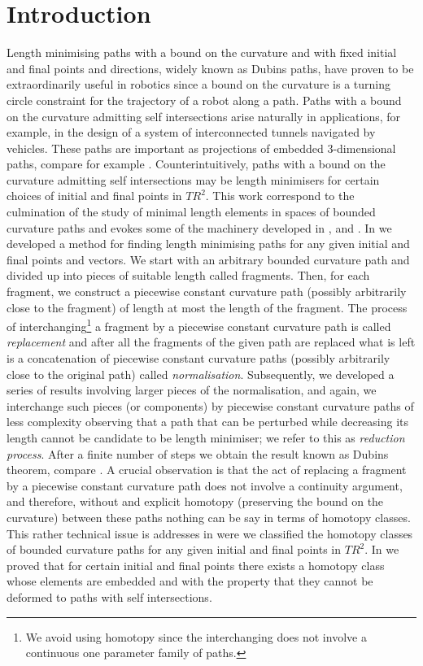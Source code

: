 \documentclass{amsart}
\theoremstyle{definition}
\theoremstyle{remark}
\numberwithin{equation}{section}
\begin{document}
\section{Introduction}
Length minimising paths with a bound on the curvature and with fixed initial and final points and directions, widely known as Dubins paths, have proven to be extraordinarily useful in robotics since a bound on the curvature is a turning circle constraint for the trajectory of a robot along a path. Paths with a bound on the curvature admitting self intersections arise naturally in applications, for example, in the design of a system of interconnected tunnels navigated by vehicles. These paths are important as projections of embedded 3-dimensional paths, compare for example \cite{brazil 1}. Counterintuitively, paths with a bound on the curvature admitting self intersections may be length minimisers for certain choices of initial and final points in $T{R}^2$. This work correspond to the culmination of the study of minimal length elements in spaces of bounded curvature paths and evokes some of the machinery developed in \cite{papera}, \cite{paperd} and \cite{paperc}. In \cite{papera} we developed a method for finding length minimising paths for any given initial and final points and vectors. We start with an arbitrary bounded curvature path and divided up into pieces of suitable length called fragments. Then, for each fragment, we construct a piecewise constant curvature path (possibly arbitrarily close to the fragment) of length at most the length of the fragment. The process of interchanging\footnote{We avoid using homotopy since the interchanging does not involve a continuous one parameter family of paths.} a fragment by a piecewise constant curvature path is called {\it replacement} and after all the fragments of the given path are replaced what is left is a concatenation of piecewise constant curvature paths (possibly arbitrarily close to the original path) called {\it normalisation}. Subsequently, we developed a series of results involving larger pieces of the normalisation, and again, we interchange such pieces (or components) by piecewise constant curvature paths of less complexity observing that a path that can be perturbed while decreasing its length cannot be candidate to be length minimiser; we refer to this as {\it reduction process}. After a finite number of steps we obtain the result known as Dubins theorem, compare \cite{dubins 1}. A crucial observation is that the act of replacing a fragment by a piecewise constant curvature path does not involve a continuity argument, and therefore, without and explicit homotopy (preserving the bound on the curvature) between these paths nothing can be say in terms of homotopy classes. This rather technical issue is addresses in \cite{paperd} were we classified the homotopy classes of bounded curvature paths for any given initial and final points in $TR^2$.  In \cite{paperc} we proved that for certain initial and final points there exists a homotopy class whose elements are embedded and with the property that they cannot be deformed to paths with self intersections. 
\end{document}
